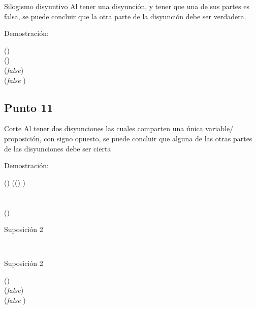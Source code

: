 \documentclass{article}
\begin{document}
\begin{logicenv}[5]{Silogismo disyuntivo}
    Al tener una disyunción, y tener que una de sus partes es falsa, se puede concluir que la otra parte de la disyunción debe ser verdadera.

    Demostración:
    \begin{logic}
        (\phi \lor \psi)\\
        (\neg \phi)\\
        (\phi \equiv \textrm{\textit{false}})\\
        (\textrm{\textit{false}} \lor \psi)\\
        \psi
    \end{logic}
\end{logicenv}

\subsection{Punto 11}

\begin{logicenv}{Corte}
    Al tener dos disyunciones las cuales comparten una única variable/ proposición, con signo opuesto, se puede concluir que alguna de las otras partes de las disyunciones debe ser cierta

    Demostración:
    \begin{logic}
        (\phi \lor \psi)
        ((\neg \phi) \lor \tau)\\
        \\
        \\
        (\psi \lor \tau)
    \end{logic}
\end{logicenv}
\begin{subproof}{Suposición 2}
    \begin{logic}
        \phi\\
        \tau
    \end{logic}
\end{subproof}
\begin{subproof}{Suposición 2}
    \begin{logic}
        (\neg \phi)\\
        (\phi \equiv \textrm{\textit{false}})\\
        (\textrm{\textit{false}} \lor \psi)\\
        \psi 
    \end{logic}
\end{subproof}
\end{document}
